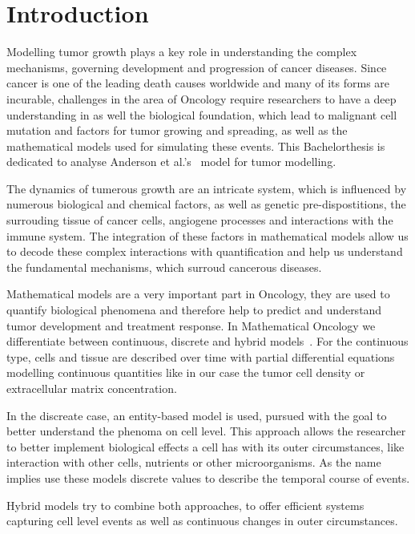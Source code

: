 \section{Introduction}
Modelling tumor growth plays a key role in understanding the complex mechanisms, governing development and progression of cancer diseases. Since cancer is one of the leading death causes worldwide and many of its forms are incurable, challenges in the area of Oncology require researchers to have a deep understanding in as well the biological foundation, which lead to malignant cell mutation and factors for tumor growing and spreading, as well as the mathematical models used for simulating these events. This Bachelorthesis is dedicated to analyse Anderson et al.'s~\cite{anderson_continuous_1998,anderson_mathematical_2000} model for tumor modelling.

The dynamics of tumerous growth are an intricate system, which is influenced by numerous biological and chemical factors, as well as genetic pre-dispostitions, the surrouding tissue of cancer cells, angiogene processes and interactions with the immune system. The integration of these factors in mathematical models allow us to decode these complex interactions with quantification and help us understand the fundamental mechanisms, which surroud cancerous diseases.

Mathematical models are a very important part in Oncology,  they are used to quantify biological phenomena and therefore help to predict and understand tumor development and treatment response. In Mathematical Oncology we differentiate between continuous, discrete and hybrid models~\cite{BEKISZ2020101198}. For the continuous type, cells and tissue are described over time with partial differential equations modelling continuous quantities like in our case the tumor cell density or extracellular matrix concentration.

In the discreate case, an entity-based model is used, pursued with the goal to better understand the phenoma on cell level. This approach allows the researcher to better implement biological effects a cell has with its outer circumstances, like interaction with other cells, nutrients or other microorganisms. As the name implies use these models discrete values to describe the temporal course of events.

Hybrid models try to combine both approaches, to offer efficient systems capturing cell level events as well as continuous changes in outer circumstances.


